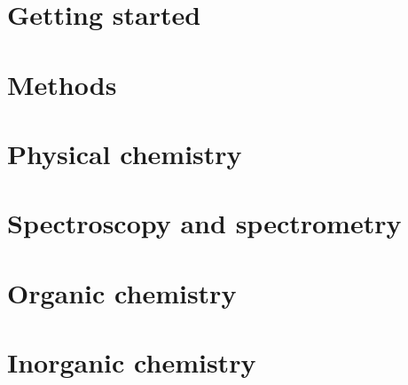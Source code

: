 \part{Getting started}








\part{Methods}











\part{Physical chemistry}








\part{Spectroscopy and spectrometry}







\part{Organic chemistry}







\part{Inorganic chemistry}






